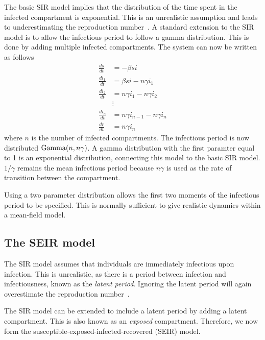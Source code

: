 \documentclass[thesis.tex]{subfiles}
\begin{document}
The basic SIR model implies that the distribution of the time spent in the infected compartment is exponential.
This is an unrealistic assumption and leads to underestimating the reproduction number~\autocites{lloydRealistic}{wearingAppropriate}.
A standard extension to the SIR model is to allow the infectious period to follow a gamma distribution.
This is done by adding multiple infected compartments.
The system can now be written as follows
\begin{align}
\frac{ds}{dt} &= -\beta si \\
\frac{di_1}{dt} &= \beta si - n\gamma i_1 \\
\frac{di_2}{dt} &= n\gamma i_1 - n \gamma i_2 \\
&\vdots \nonumber \\
\frac{di_n}{dt} &= n\gamma i_{n-1} - n \gamma i_n \\
\frac{dr}{dt} &= n\gamma i_n
\end{align}
where $n$ is the number of infected compartments.
The infectious period is now distributed $\operatorname{Gamma}(n, n\gamma)$.
A gamma distribution with the first paramter equal to 1 is an exponential distribution, connecting this model to the basic SIR model.
$1/\gamma$ remains the mean infectious period because $n\gamma$ is used as the rate of transition between the compartment.

Using a two parameter distribution allows the first two moments of the infectious period to be specified.
This is normally sufficient to give realistic dynamics within a mean-field model.

\subsection{The SEIR model}

The SIR model assumes that individuals are immediately infectious upon infection.
This is unrealistic, as there is a period between infection and infectiousness, known as the \emph{latent period}.
Ignoring the latent period will again overestimate the reproduction number~\autocite{wearingAppropriate}.

The SIR model can be extended to include a latent period by adding a latent compartment.
This is also known as an \emph{exposed} compartment.
Therefore, we now form the susceptible-exposed-infected-recovered (SEIR) model.
\end{document}
